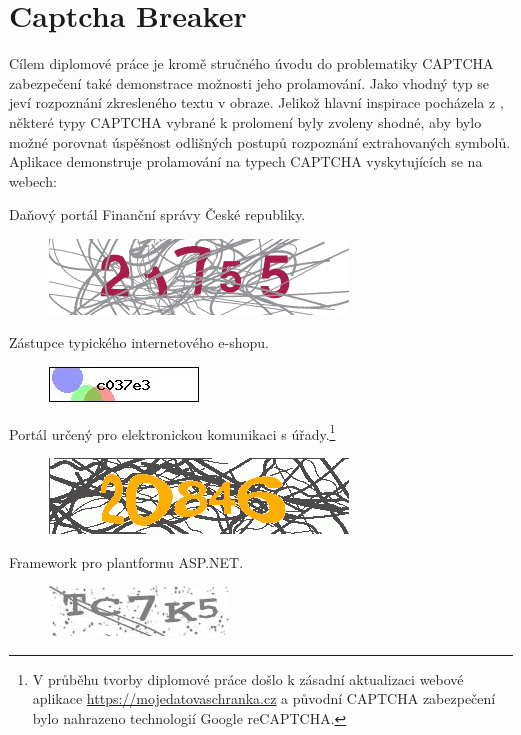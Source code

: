 \documentclass[
  field=ainfp,
  master=true,
  biblatex,
  sourcecodes=false,
  theorems=false,
  glossaries,
  index
]{kidiplom}
\begin{document}
\section{Captcha Breaker}
Cílem diplomové práce je kromě stručného úvodu do problematiky CAPTCHA zabezpečení také demonstrace možnosti jeho prolamování. Jako vhodný typ se jeví rozpoznání zkresleného textu v obraze. Jelikož hlavní inspirace pocházela z \cite{Kopp2016HowTM}, některé typy CAPTCHA vybrané k prolomení byly zvoleny shodné, aby bylo možné porovnat úspěšnost odlišných postupů rozpoznání extrahovaných symbolů. Aplikace demonstruje prolamování na typech CAPTCHA vyskytujících se na webech:
\begin{description}[align=left]
\item [adiseet.mfcr.cz] Daňový portál Finanční správy České republiky.
\begin{figure}[H]
  \centering
  \includegraphics[scale=0.5]{images/eet.png}
\end{figure}

\item [kamody.cz] Zástupce typického internetového e-shopu.
\begin{figure}[H]
  \centering
  \includegraphics{images/kamody.jpg}
\end{figure}

\item [mojedatovaschranka.cz] Portál určený pro elektronickou komunikaci s úřady.\footnote{V průběhu tvorby diplomové práce došlo k zásadní aktualizaci webové aplikace \url{https://mojedatovaschranka.cz} a původní CAPTCHA zabezpečení bylo nahrazeno technologií Google reCAPTCHA.}
\begin{figure}[H]
  \centering
  \includegraphics[scale=0.5]{images/datovka.png}
\end{figure}

\item [telerik.com] Framework pro plantformu ASP.NET.
\begin{figure}[H]
  \centering
  \includegraphics{images/telerik.jpg}
\end{figure}


\end{description}
\end{document}
